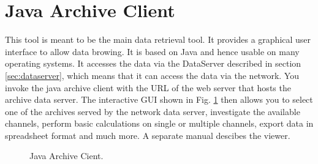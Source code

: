 \section{Java Archive Client} \label{sec:javaclient}
This tool is meant to be the main data retrieval tool. It provides a
graphical user interface to allow data browing. It is based on Java
and hence usable on many operating systems. It accesses the data via
the DataServer described in section \ref{sec:dataserver}, which means
that it can access the data via the network.  You invoke the java
archive client with the URL of the web server that hosts the archive
data server. The interactive GUI shown in Fig. \ref{fig:javatool} then
allows you to select one of the archives served by the network data
server, investigate the available channels, perform basic calculations
on single or multiple channels, export data in spreadsheet format and much more.
A separate manual descibes the viewer.

\medskip

\begin{figure}[htb]
\begin{center}
\end{center}
\caption{\label{fig:javatool}Java Archive Cient.}
\end{figure}
